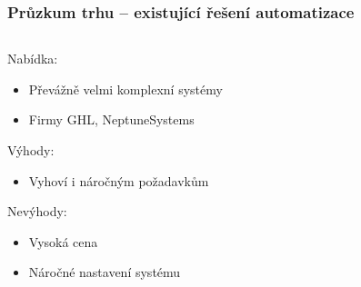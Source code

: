 \documentclass[%
  12pt,       				%
	t,                  %
	aspectratio=1610,   %
	unicode,						%
]{beamer}				    	%
\begin{document}

\begin{frame}[fragile]
	\frametitle{Průzkum trhu -- existující řešení automatizace}
	
	\begin{columns}[T] 								%
		\begin{column}{0.5\textwidth}		%
			Nabídka:\\[1ex]
			\begin{itemize}
				\item Převážně velmi komplexní systémy
				\item Firmy GHL, NeptuneSystems
			\end{itemize}

			\vspace{1.5ex}%
			Výhody:\\[1ex]
			\begin{itemize}
				\item Vyhoví i náročným požadavkům
			\end{itemize}
			
			\vspace{1.5ex}%
			Nevýhody:\\[1ex]
			\begin{itemize}
				\item Vysoká cena 
				\item Náročné nastavení systému
			\end{itemize}
			

\end{column}
\end{columns}
\end{frame}
\end{document}
